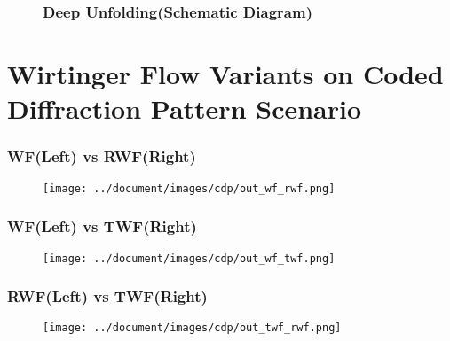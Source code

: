 \documentclass{beamer}
\theoremstyle{definition}
\theoremstyle{remark}
\begin{document}
\begin{frame}
  \begin{figure}
    \frametitle{Deep Unfolding(Schematic Diagram)}
    \centering
    \resizebox{1.0\textwidth}{!}{}
    \label{fig:deep_unfolding}
  \end{figure}
\end{frame}

\section[WF* Using CDPs]{Wirtinger Flow Variants on Coded Diffraction Pattern Scenario}



\begin{frame}
\frametitle{WF(Left) vs RWF(Right)}
  \begin{figure}[!htbp]
    \centering
    \texttt{[image: ../document/images/cdp/out\_wf\_rwf.png]}
  \label{image:wf_vs_rwf}
  \end{figure}
\end{frame}

\begin{frame}
   \frametitle{WF(Left) vs TWF(Right)}
     \begin{figure}[!htbp]
       \centering
       \texttt{[image: ../document/images/cdp/out\_wf\_twf.png]}
     \label{images:wf_vs_twf_cdp}
     \end{figure}
   \end{frame}
\begin{frame}
\frametitle{RWF(Left) vs TWF(Right)}
  \begin{figure}[!htbp]
    \centering
    \texttt{[image: ../document/images/cdp/out\_twf\_rwf.png]}
  \label{image:twf_vs_rwf_cdp}
  \end{figure}
\end{frame}
\end{document}
